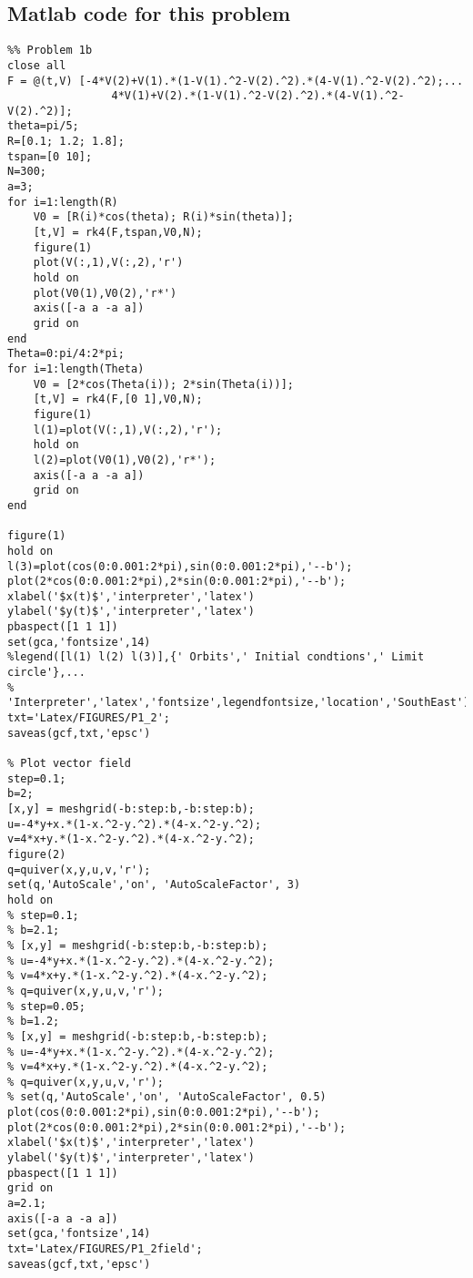 \subsection*{Matlab code for this problem}
\begin{verbatim}
%% Problem 1b
close all
F = @(t,V) [-4*V(2)+V(1).*(1-V(1).^2-V(2).^2).*(4-V(1).^2-V(2).^2);...
                4*V(1)+V(2).*(1-V(1).^2-V(2).^2).*(4-V(1).^2-V(2).^2)];
theta=pi/5;
R=[0.1; 1.2; 1.8];
tspan=[0 10];
N=300;
a=3;
for i=1:length(R)
    V0 = [R(i)*cos(theta); R(i)*sin(theta)];
    [t,V] = rk4(F,tspan,V0,N);
    figure(1)
    plot(V(:,1),V(:,2),'r')
    hold on
    plot(V0(1),V0(2),'r*')
    axis([-a a -a a])
    grid on
end
Theta=0:pi/4:2*pi;
for i=1:length(Theta)
    V0 = [2*cos(Theta(i)); 2*sin(Theta(i))];
    [t,V] = rk4(F,[0 1],V0,N);
    figure(1)
    l(1)=plot(V(:,1),V(:,2),'r');
    hold on
    l(2)=plot(V0(1),V0(2),'r*');
    axis([-a a -a a])
    grid on
end

figure(1)
hold on
l(3)=plot(cos(0:0.001:2*pi),sin(0:0.001:2*pi),'--b');
plot(2*cos(0:0.001:2*pi),2*sin(0:0.001:2*pi),'--b');
xlabel('$x(t)$','interpreter','latex')
ylabel('$y(t)$','interpreter','latex')
pbaspect([1 1 1])
set(gca,'fontsize',14)
%legend([l(1) l(2) l(3)],{' Orbits',' Initial condtions',' Limit circle'},...
% 'Interpreter','latex','fontsize',legendfontsize,'location','SouthEast')
txt='Latex/FIGURES/P1_2';
saveas(gcf,txt,'epsc')

% Plot vector field
step=0.1;
b=2;
[x,y] = meshgrid(-b:step:b,-b:step:b);
u=-4*y+x.*(1-x.^2-y.^2).*(4-x.^2-y.^2);
v=4*x+y.*(1-x.^2-y.^2).*(4-x.^2-y.^2);
figure(2)
q=quiver(x,y,u,v,'r');
set(q,'AutoScale','on', 'AutoScaleFactor', 3)
hold on
% step=0.1;
% b=2.1;
% [x,y] = meshgrid(-b:step:b,-b:step:b);
% u=-4*y+x.*(1-x.^2-y.^2).*(4-x.^2-y.^2);
% v=4*x+y.*(1-x.^2-y.^2).*(4-x.^2-y.^2);
% q=quiver(x,y,u,v,'r');
% step=0.05;
% b=1.2;
% [x,y] = meshgrid(-b:step:b,-b:step:b);
% u=-4*y+x.*(1-x.^2-y.^2).*(4-x.^2-y.^2);
% v=4*x+y.*(1-x.^2-y.^2).*(4-x.^2-y.^2);
% q=quiver(x,y,u,v,'r');
% set(q,'AutoScale','on', 'AutoScaleFactor', 0.5)
plot(cos(0:0.001:2*pi),sin(0:0.001:2*pi),'--b');
plot(2*cos(0:0.001:2*pi),2*sin(0:0.001:2*pi),'--b');
xlabel('$x(t)$','interpreter','latex')
ylabel('$y(t)$','interpreter','latex')
pbaspect([1 1 1])
grid on
a=2.1;
axis([-a a -a a])
set(gca,'fontsize',14)
txt='Latex/FIGURES/P1_2field';
saveas(gcf,txt,'epsc')
\end{verbatim}